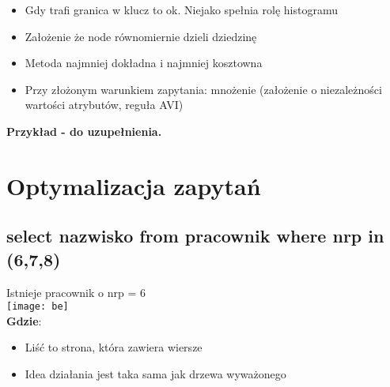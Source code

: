 \documentclass[a4paper,twoside]{article}
\begin{document}
\begin{itemize}
\begin{itemize}
  			\begin{itemize}
  				\item Gdy trafi granica w klucz to ok. Niejako spełnia rolę histogramu
  				\item Założenie że node równomiernie dzieli dziedzinę
  				\item Metoda najmniej dokładna i najmniej kosztowna
  				\item Przy złożonym warunkiem zapytania: mnożenie (założenie o niezależności wartości atrybutów, reguła AVI)
  			\end{itemize}
  			\textbf{Przykład - do uzupełnienia.}
		\end{itemize}
  	\end{itemize}
  	
  	\section*{Optymalizacja zapytań} \noindent 
  	\subsection*{select nazwisko from pracownik where nrp in (6,7,8)} 
  	Istnieje pracownik o nrp = 6\\
  	\texttt{[image: be]}\\
  	\textbf{Gdzie}:
  	\begin{itemize}
  		\item Liść to strona, która zawiera wiersze
  		\item Idea działania jest taka sama jak drzewa wyważonego
  	\end{itemize}
\end{document}
